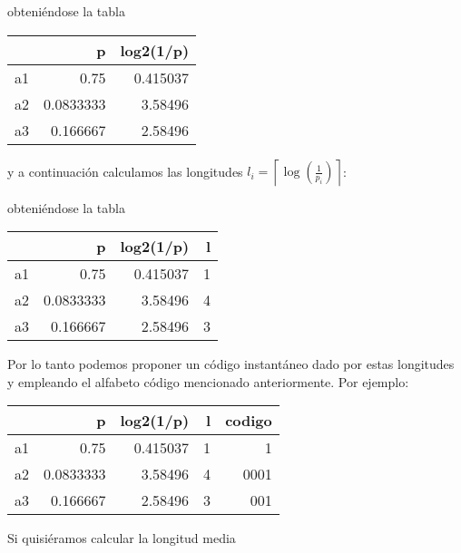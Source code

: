 obteniéndose la tabla

\begin{longtable}[]{@{}lrr@{}}
\toprule\noalign{}
& p & log2(1/p) \\
\midrule\noalign{}
\endhead
\bottomrule\noalign{}
\endlastfoot
a1 & 0.75 & 0.415037 \\
a2 & 0.0833333 & 3.58496 \\
a3 & 0.166667 & 2.58496 \\
\end{longtable}

y a continuación calculamos las longitudes
\(l_i = \left\lceil\log\left(\frac{1}{p_i}\right)\right\rceil\):

\begin{Shaded}
\begin{Highlighting}[]
\NormalTok{df[}\NormalTok{] }\OperatorTok{=}\NormalTok{ np.ceil(df[}\NormalTok{])}
\end{Highlighting}
\end{Shaded}

obteniéndose la tabla

\begin{longtable}[]{@{}lrrr@{}}
\toprule\noalign{}
& p & log2(1/p) & l \\
\midrule\noalign{}
\endhead
\bottomrule\noalign{}
\endlastfoot
a1 & 0.75 & 0.415037 & 1 \\
a2 & 0.0833333 & 3.58496 & 4 \\
a3 & 0.166667 & 2.58496 & 3 \\
\end{longtable}

Por lo tanto podemos proponer un código instantáneo dado por estas
longitudes y empleando el alfabeto código mencionado anteriormente. Por
ejemplo:

\begin{longtable}[]{@{}lrrrr@{}}
\toprule\noalign{}
& p & log2(1/p) & l & codigo \\
\midrule\noalign{}
\endhead
\bottomrule\noalign{}
\endlastfoot
a1 & 0.75 & 0.415037 & 1 & 1 \\
a2 & 0.0833333 & 3.58496 & 4 & 0001 \\
a3 & 0.166667 & 2.58496 & 3 & 001 \\
\end{longtable}

Si quisiéramos calcular la longitud media

\begin{Shaded}
\begin{Highlighting}[]
\NormalTok{(df[}\NormalTok{]}\OperatorTok{*}\NormalTok{df[}\NormalTok{]).}\NormalTok{()}
\end{Highlighting}
\end{Shaded}

